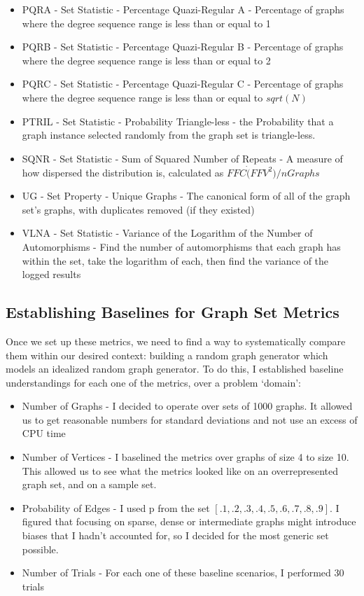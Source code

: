 \begin{itemize}
\item{PQRA - Set Statistic - Percentage Quazi-Regular A - Percentage of graphs where the degree sequence range is less than or equal to 1}
\item{PQRB - Set Statistic - Percentage Quazi-Regular B - Percentage of graphs where the degree sequence range is less than or equal to 2}
\item{PQRC - Set Statistic - Percentage Quazi-Regular C - Percentage of graphs where the degree sequence range is less than or equal to $sqrt(N)$}
\item{PTRIL - Set Statistic - Probability Triangle-less - the Probability that a graph instance selected randomly from the graph set is triangle-less.}
\item{SQNR - Set Statistic - Sum of Squared Number of Repeats - A measure of how dispersed the distribution is, calculated as $FFC \dot (FFV^2) / nGraphs$}
\item{UG - Set Property - Unique Graphs - The canonical form of all of the graph set's graphs, with duplicates removed (if they existed)}
\item{VLNA - Set Statistic - Variance of the Logarithm of the Number of Automorphisms - Find the number of automorphisms that each graph has within the set, take the logarithm of each, then find the variance of the logged results}
\end{itemize}

\subsection{Establishing Baselines for Graph Set Metrics}

Once we set up these metrics, we need to find a way to systematically compare them within our desired context: building a random graph generator which models an idealized random graph generator.
To do this, I established baseline understandings for each one of the metrics, over a problem `domain':
\begin{itemize}
\item{Number of Graphs - I decided to operate over sets of 1000 graphs.  It allowed us to get reasonable numbers for standard deviations and not use an excess of CPU time}
\item{Number of Vertices - I baselined the metrics over graphs of size 4 to size 10.  This allowed us to see what the metrics looked like on an overrepresented graph set, and on a sample set.}
\item{Probability of Edges - I used p from the set $[.1, .2, .3, .4, .5, .6, .7, .8, .9]$. I figured that focusing on sparse, dense or intermediate graphs might introduce biases that I hadn't accounted for, so I decided for the most generic set possible.}
\item{Number of Trials - For each one of these baseline scenarios, I performed 30 trials}
\end{itemize}

